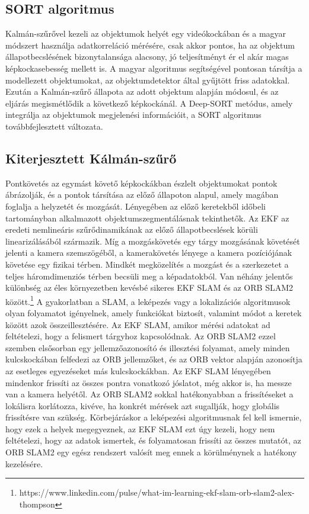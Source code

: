\subsection{SORT algoritmus}
Kalmán-szűrővel kezeli az objektumok helyét egy videókockában és a magyar módszert használja adatkorreláció mérésére, csak akkor pontos, ha az objektum állapotbecslésének bizonytalansága alacsony, jó teljesítményt ér el akár magas képkockasebesség mellett is. A magyar algoritmus segítségével pontosan társítja a modellezett objektumokat, az objektumdetektor által gyűjtött friss adatokkal. Ezután a Kalmán-szűrő állapota az adott objektum alapján módosul, és az eljárás megismétlődik a következő képkockánál. A Deep-SORT metódus, amely integrálja az objektumok megjelenési információit, a SORT algoritmus továbbfejlesztett változata.

\subsection{Kiterjesztett Kálmán-szűrő\cite{strasdat2012local,zhang2018mobile}}
Pontkövetés az egymást követő képkockákban észlelt objektumokat pontok ábrázolják, és a pontok társítása az előző állapoton alapul, amely magában foglalja a helyzetét és mozgását. Lényegében az előző keretekből időbeli tartományban alkalmazott objektumszegmentálásnak tekinthetők. Az EKF az eredeti nemlineáris szűrődinamikának az előző állapotbecslések körüli linearizálásából származik. Míg a mozgáskövetés egy tárgy mozgásának követését jelenti a kamera szemszögéből, a kamerakövetés lényege a kamera pozíciójának követése egy fizikai térben. Mindkét megközelítés a mozgást és a szerkezetet a teljes háromdimenziós térben becsüli meg a képadatokból. 
Van néhány jelentős különbség az éles környezetben kevésbé sikeres EKF SLAM és az ORB SLAM2 között.\footnote{https://www.linkedin.com/pulse/what-im-learning-ekf-slam-orb-slam2-alex-thompson} A gyakorlatban a SLAM, a leképezés vagy a lokalizációs algoritmusok olyan folyamatot igényelnek, amely funkciókat biztosít, valamint módot a keretek között azok összeillesztésére. Az EKF SLAM, amikor mérési adatokat ad feltételezi, hogy a felismert tárgyhoz kapcsolódnak. Az ORB SLAM2 ezzel szemben elsősorban egy jellemzőazonosító és illesztési folyamat, amely minden kulcskockában felfedezi az ORB jellemzőket, és az ORB vektor alapján azonosítja az esetleges egyezéseket más kulcskockákban. Az EKF SLAM lényegében mindenkor frissíti az összes pontra vonatkozó jóslatot, még akkor is, ha messze van a kamera helyétől. Az ORB SLAM2 sokkal hatékonyabban a frissítéseket a lokálisra korlátozza, kivéve, ha konkrét mérések azt sugallják, hogy globális frissítésre van szükség. Körbejáráskor a leképezési algoritmusnak fel kell ismernie, hogy ezek a helyek megegyeznek, az EKF SLAM ezt úgy kezeli, hogy nem feltételezi, hogy az adatok ismertek, és folyamatosan frissíti az összes mutatót, az ORB SLAM2 egy egész rendszert valósít meg ennek a körülménynek a hatékony kezelésére.
